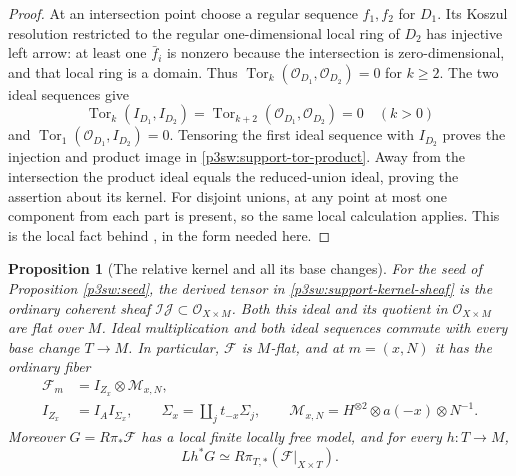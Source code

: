 \documentclass[11pt]{article}
\newtheorem{proposition}[theorem]{Proposition}
\numberwithin{equation}{section}
\begin{document}
\begin{proof}
At an intersection point choose a regular sequence \(f_1,f_2\) for
\(D_1\).  Its Koszul resolution restricted to the regular
one-dimensional local ring of \(D_2\) has injective left arrow:
at least one \(\bar f_i\) is nonzero because the intersection is
zero-dimensional, and that local ring is a domain.  Thus
\(\operatorname{Tor}_k(\mathcal O_{D_1},\mathcal O_{D_2})=0\)
for \(k\geq2\).  The two ideal sequences give
\[
 \operatorname{Tor}_k(I_{D_1},I_{D_2})
 =\operatorname{Tor}_{k+2}(\mathcal O_{D_1},\mathcal O_{D_2})=0
 \quad(k>0)
\]
and \(\operatorname{Tor}_1(\mathcal O_{D_1},I_{D_2})=0\).
Tensoring the first ideal sequence with \(I_{D_2}\) proves the
injection and product image in \eqref{p3sw:support-tor-product}.  Away from the intersection the
product ideal equals the reduced-union ideal, proving the assertion
about its kernel.  For disjoint unions, at any point at most one
component from each part is present, so the same local calculation
applies.  This is the local fact behind
\cite[Appendix 11, pp.~91--93]{Markman2025Secant}, in the form needed
here.
\end{proof}

\begin{proposition}[The relative kernel and all its base changes]
\label{p3sw:relative-kernel}
For the seed of Proposition \ref{p3sw:seed}, the derived tensor in
\eqref{p3sw:support-kernel-sheaf} is the ordinary coherent sheaf
\(\mathscr I\mathscr J\subset\mathcal O_{X\times M}\).
Both this ideal and its quotient in \(\mathcal O_{X\times M}\) are
flat over \(M\).  Ideal multiplication and both ideal sequences
commute with every base change \(T\to M\).  In particular,
\(\mathscr F\) is \(M\)-flat, and at \(m=(x,N)\) it has the ordinary
fiber
\begin{equation}
 \begin{split}
 \mathscr F_m&=I_{Z_x}\otimes\mathcal M_{x,N},\\
 I_{Z_x}&=I_A I_{\Sigma_x},\qquad
 \Sigma_x=\coprod_jt_{-x}\Sigma_j,\qquad
 \mathcal M_{x,N}=H^{\otimes2}\otimes a(-x)\otimes N^{-1}.
 \end{split}
 \label{p3sw:support-fiber-formula}
\end{equation}
Moreover \(G=R\pi_*\mathscr F\) has a local finite locally free
model, and for every \(h:T\to M\),
\begin{equation}
 Lh^*G\simeq R\pi_{T,*}(\mathscr F|_{X\times T}).
 \label{p3sw:support-kernel-base-change}
\end{equation}
\end{proposition}
\end{document}
